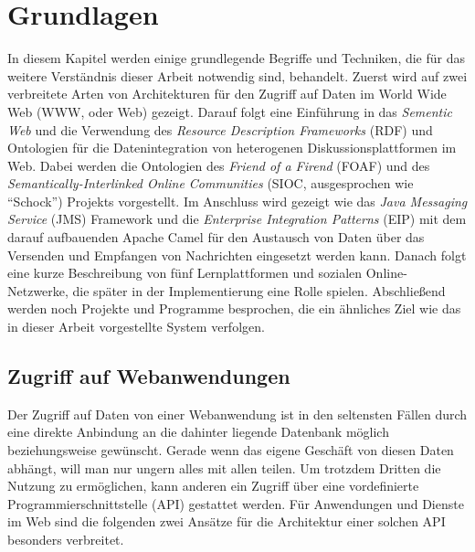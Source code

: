 

\chapter{Grundlagen} %
\label{cha:grundlagen}


In diesem Kapitel werden einige grundlegende Begriffe und Techniken, die für das weitere Verständnis dieser Arbeit notwendig sind, behandelt. Zuerst wird auf zwei verbreitete Arten von Architekturen für den Zugriff auf Daten im World Wide Web (WWW, oder Web) gezeigt. Darauf folgt eine Einführung in das \emph{Sementic Web} und die Verwendung des \emph{Resource Description Frameworks} (RDF) und Ontologien für die Datenintegration von heterogenen Diskussionsplattformen im Web. Dabei werden die Ontologien des \emph{Friend of a Firend} (FOAF) und des \emph{Semantically-Interlinked Online Communities} (SIOC, ausgesprochen wie \enquote{Schock}) Projekts vorgestellt. Im Anschluss wird gezeigt wie das \emph{Java Messaging Service} (JMS) Framework und die \emph{Enterprise Integration Patterns} (EIP) mit dem darauf aufbauenden Apache Camel für den Austausch von Daten über das Versenden und Empfangen von Nachrichten eingesetzt werden kann. Danach folgt eine kurze Beschreibung von fünf Lernplattformen und sozialen Online-Netzwerke, die später in der Implementierung eine Rolle spielen. Abschließend werden noch Projekte und Programme besprochen, die ein ähnliches Ziel wie das in dieser Arbeit vorgestellte System verfolgen.

\section{Zugriff auf Webanwendungen} %
\label{sec:zugriff_auf_webanwendungen}

Der Zugriff auf Daten von einer Webanwendung ist in den seltensten Fällen durch eine direkte Anbindung an die dahinter liegende Datenbank möglich beziehungsweise gewünscht. Gerade wenn das eigene Geschäft von diesen Daten abhängt, will man nur ungern alles mit allen teilen. Um trotzdem Dritten die Nutzung zu ermöglichen, kann anderen ein Zugriff über eine vordefinierte Programmierschnittstelle (API) gestattet werden. Für Anwendungen und Dienste im Web sind die folgenden zwei Ansätze für die Architektur einer solchen API besonders verbreitet. 

